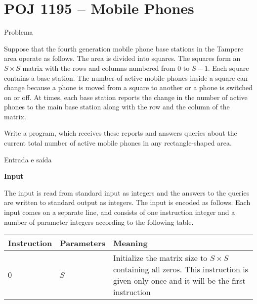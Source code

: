 \section{POJ 1195 -- Mobile Phones}

\begin{frame}[fragile]{Problema}

Suppose that the fourth generation mobile phone base stations in the Tampere area operate as 
follows. The area is divided into squares. The squares form an $S \times S$ matrix with the rows 
and columns numbered from $0$ to $S-1$. Each square contains a base station. The number of active 
mobile phones inside a square can change because a phone is moved from a square to another or a 
phone is switched on or off. At times, each base station reports the change in the number of 
active phones to the main base station along with the row and the column of the matrix. 

Write a program, which receives these reports and answers queries about the current total number 
of active mobile phones in any rectangle-shaped area. 

\end{frame}

\begin{frame}[fragile]{Entrada e saída}

\textbf{Input}

The input is read from standard input as integers and the answers to the queries are written to standard output as integers. The input is encoded as follows. Each input comes on a separate line, and consists of one instruction integer and a number of parameter integers according to the following table. 

\begin{tabularx}{0.95\textwidth}{llX}
    \toprule
    \textbf{Instruction} & \textbf{Parameters} & \textbf{Meaning} \\
    \midrule
    $0$ & $S$ & Initialize the matrix size to $S\times S$ containing all zeros. This instruction
        is given only once and it will be the first instruction \\
    \bottomrule
\end{tabularx}

\end{frame}

